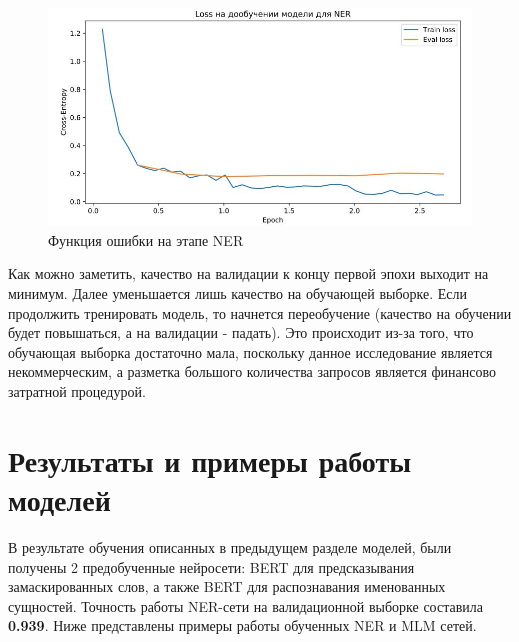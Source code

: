 \documentclass[12pt,a4paper]{article}
\begin{document}
\begin{figure}[H]
	\begin{center}
		\includegraphics[scale=0.4]{loss_ner.jpg}
	\end{center}
	\caption{Функция ошибки на этапе NER}
\end{figure}

\noindent Как можно заметить, качество на валидации к концу первой эпохи выходит на минимум. Далее уменьшается лишь качество на обучающей выборке. Если продолжить тренировать модель, то начнется переобучение (качество на обучении будет повышаться, а на валидации - падать). Это происходит из-за того, что обучающая выборка достаточно мала, поскольку данное исследование является некоммерческим, а разметка большого количества запросов является финансово затратной процедурой.

\section{Результаты и примеры работы моделей}

В результате обучения описанных в предыдущем разделе моделей, были получены 2 предобученные нейросети: BERT для предсказывания замаскированных слов, а также BERT для распознавания именованных сущностей. Точность работы NER-сети на валидационной выборке составила \textbf{0.939}. Ниже представлены примеры работы обученных NER и MLM сетей.
\end{document}
